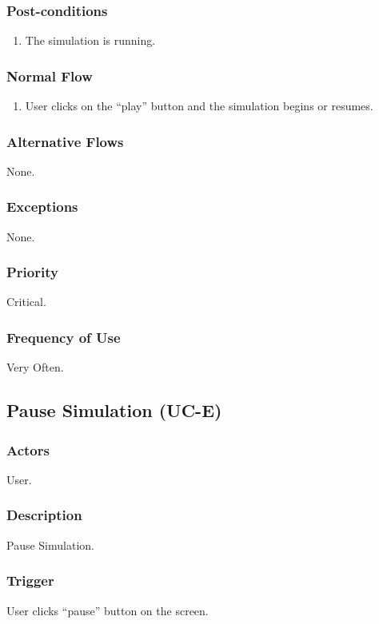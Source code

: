 \documentclass[a4paper,11pt,titlepage]{article}
\begin{document}
\subsubsection{Post-conditions}
\begin{enumerate}
  \item The simulation is running.
\end{enumerate}

\subsubsection{Normal Flow}
\begin{enumerate}
  \item User clicks on the ``play'' button and the simulation begins or resumes. 
\end{enumerate}

\subsubsection{Alternative Flows}
None.

\subsubsection{Exceptions}
None.

\subsubsection{Priority}
Critical.

\subsubsection{Frequency of Use}
Very Often.


\subsection{Pause Simulation (UC-E)}
\subsubsection{Actors}
User.

\subsubsection{Description}
Pause Simulation.

\subsubsection{Trigger}
User clicks ``pause'' button on the screen.
\end{document}
